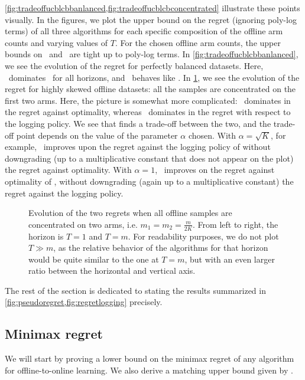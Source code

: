 \cref{fig:tradeoffucblcbbanlanced,fig:tradeoffucblcbconcentrated} illustrate these points visually. In the figures, we plot the upper bound on the regret (ignoring poly-log terms) of all three algorithms for each specific composition of the offline arm counts and varying values of $T$. For the chosen offline arm counts, the upper bounds on \algucb\ and \alglcb\ are tight up to poly-log terms. 
In \cref{fig:tradeoffucblcbbanlanced}, we see the evolution of the regret for perfectly balanced datasets. Here, \algucb\ dominates \alglcb\ for all horizons, and \algoname\ behaves like \algucb.
In \cref{fig:tradeoffucblcbconcentrated}, we see the evolution of the regret for highly skewed offline datasets: all the samples are concentrated on the first two arms. 
Here, the picture is somewhat more complicated: \algucb\ dominates in the regret against optimality, whereas \alglcb\ dominates in the regret with respect to the logging policy. We see that \algoname finds a trade-off between the two, and the trade-off point depends on the value of the parameter $\alpha$ chosen. With $\alpha=\sqrt{K}$, for example, \algoname\ improves upon the regret against the logging policy of \algucb without downgrading (up to a multiplicative constant that does not appear on the plot) the regret against optimality. With $\alpha=1$, \algoname\ improves on the regret against optimality of \alglcb, without downgrading (again up to a multiplicative constant) the regret against the logging policy.

\begin{figure}[htb]
\begin{center}
  \caption{Evolution of the two regrets when all offline samples are concentrated on two arms, i.e. $m_1=m_2=\frac{m}{2K}$. From left to right, the horizon is $T=1$ and $T=m$. For readability purposes, we do not plot $T\gg m$, as the relative behavior of the algorithms for that horizon would be quite similar to the one at $T=m$, but with an even larger ratio between the horizontal and vertical axis. }
\label{fig:tradeoffucblcbconcentrated}
\end{center}
\end{figure}


The rest of the section is dedicated to stating the results summarized in \cref{fig:pseudoregret,fig:regretlogging} precisely.


\subsection{Minimax regret}
We will start by proving a lower bound on the minimax regret of any algorithm for offline-to-online learning. We also derive a matching upper bound given by \algucb. 

